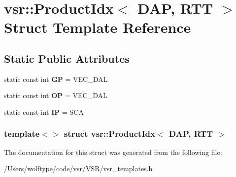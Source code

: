 \hypertarget{structvsr_1_1_product_idx_3_01_d_a_p_00_01_r_t_t_01_4}{\section{vsr\-:\-:Product\-Idx$<$ D\-A\-P, R\-T\-T $>$ Struct Template Reference}
\label{structvsr_1_1_product_idx_3_01_d_a_p_00_01_r_t_t_01_4}
}
\subsection*{Static Public Attributes}
\begin{DoxyCompactItemize}
\item 
\hypertarget{structvsr_1_1_product_idx_3_01_d_a_p_00_01_r_t_t_01_4_a652e75b609f7da9162f93e6a5cc4d0e6}{static const int {\bfseries G\-P} = V\-E\-C\-\_\-\-D\-A\-L}\label{structvsr_1_1_product_idx_3_01_d_a_p_00_01_r_t_t_01_4_a652e75b609f7da9162f93e6a5cc4d0e6}

\item 
\hypertarget{structvsr_1_1_product_idx_3_01_d_a_p_00_01_r_t_t_01_4_a2262d64be27391a7b2045dd817de01d2}{static const int {\bfseries O\-P} = V\-E\-C\-\_\-\-D\-A\-L}\label{structvsr_1_1_product_idx_3_01_d_a_p_00_01_r_t_t_01_4_a2262d64be27391a7b2045dd817de01d2}

\item 
\hypertarget{structvsr_1_1_product_idx_3_01_d_a_p_00_01_r_t_t_01_4_abf0ad61c444d5653899edaee47df5dcd}{static const int {\bfseries I\-P} = S\-C\-A}\label{structvsr_1_1_product_idx_3_01_d_a_p_00_01_r_t_t_01_4_abf0ad61c444d5653899edaee47df5dcd}

\end{DoxyCompactItemize}
\subsubsection*{template$<$$>$ struct vsr\-::\-Product\-Idx$<$ D\-A\-P, R\-T\-T $>$}



The documentation for this struct was generated from the following file\-:\begin{DoxyCompactItemize}
\item 
/\-Users/wolftype/code/vsr/\-V\-S\-R/vsr\-\_\-templates.\-h\end{DoxyCompactItemize}
